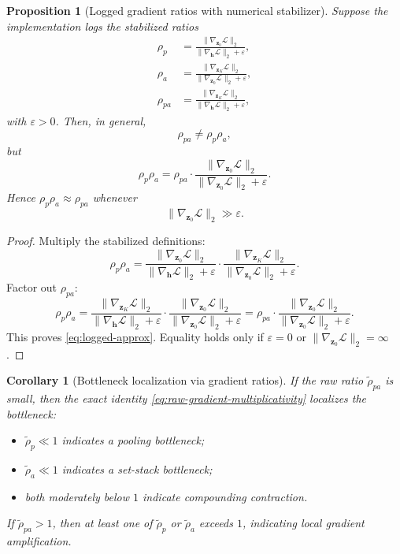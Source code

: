 \documentclass{article}
\theoremstyle{plain}
\newtheorem{proposition}[theorem]{Proposition}
\newtheorem{corollary}[theorem]{Corollary}
\theoremstyle{definition}
\theoremstyle{remark}
\begin{document}
\begin{proposition}[Logged gradient ratios with numerical stabilizer]
\label{prop:logged-gradient-ratios}
Suppose the implementation logs the stabilized ratios
\begin{align}
\rho_p
&=
\frac{\|\nabla_{\mathbf{z}_0}\mathcal{L}\|_2}
{\|\nabla_{\mathbf{h}}\mathcal{L}\|_2+\varepsilon},
\\
\rho_a
&=
\frac{\|\nabla_{\mathbf{z}_K}\mathcal{L}\|_2}
{\|\nabla_{\mathbf{z}_0}\mathcal{L}\|_2+\varepsilon},
\\
\rho_{pa}
&=
\frac{\|\nabla_{\mathbf{z}_K}\mathcal{L}\|_2}
{\|\nabla_{\mathbf{h}}\mathcal{L}\|_2+\varepsilon},
\end{align}
with $\varepsilon>0$. Then, in general,
\begin{equation}
\label{eq:logged-not-exact}
\rho_{pa}\neq \rho_p\rho_a,
\end{equation}
but
\begin{equation}
\label{eq:logged-approx}
\rho_p\rho_a
=
\rho_{pa}\cdot
\frac{\|\nabla_{\mathbf{z}_0}\mathcal{L}\|_2}
{\|\nabla_{\mathbf{z}_0}\mathcal{L}\|_2+\varepsilon}.
\end{equation}
Hence $\rho_p\rho_a \approx \rho_{pa}$ whenever
\[
\|\nabla_{\mathbf{z}_0}\mathcal{L}\|_2 \gg \varepsilon.
\]
\end{proposition}

\begin{proof}
Multiply the stabilized definitions:
\[
\rho_p\rho_a
=
\frac{\|\nabla_{\mathbf{z}_0}\mathcal{L}\|_2}{\|\nabla_{\mathbf{h}}\mathcal{L}\|_2+\varepsilon}
\cdot
\frac{\|\nabla_{\mathbf{z}_K}\mathcal{L}\|_2}{\|\nabla_{\mathbf{z}_0}\mathcal{L}\|_2+\varepsilon}.
\]
Factor out $\rho_{pa}$:
\[
\rho_p\rho_a
=
\frac{\|\nabla_{\mathbf{z}_K}\mathcal{L}\|_2}{\|\nabla_{\mathbf{h}}\mathcal{L}\|_2+\varepsilon}
\cdot
\frac{\|\nabla_{\mathbf{z}_0}\mathcal{L}\|_2}{\|\nabla_{\mathbf{z}_0}\mathcal{L}\|_2+\varepsilon}
=
\rho_{pa}\cdot
\frac{\|\nabla_{\mathbf{z}_0}\mathcal{L}\|_2}{\|\nabla_{\mathbf{z}_0}\mathcal{L}\|_2+\varepsilon}.
\]
This proves \eqref{eq:logged-approx}. Equality holds only if $\varepsilon=0$ or $\|\nabla_{\mathbf{z}_0}\mathcal{L}\|_2=\infty$.
\end{proof}

\begin{corollary}[Bottleneck localization via gradient ratios]
\label{cor:bottleneck-localization}
If the raw ratio $\tilde\rho_{pa}$ is small, then the exact identity \eqref{eq:raw-gradient-multiplicativity} localizes the bottleneck:
\begin{itemize}
    \item $\tilde\rho_p \ll 1$ indicates a pooling bottleneck;
    \item $\tilde\rho_a \ll 1$ indicates a set-stack bottleneck;
    \item both moderately below $1$ indicate compounding contraction.
\end{itemize}
If $\tilde\rho_{pa} > 1$, then at least one of $\tilde\rho_p$ or $\tilde\rho_a$ exceeds $1$, indicating local gradient amplification.
\end{corollary}
\end{document}
